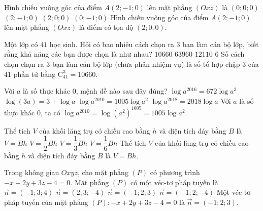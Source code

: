 \begin{ex}%
 Hình chiếu vuông góc của điểm $A(2;-1;0)$ lên mặt phẳng $(Oxz)$ là
 \choice
  {$(0;0;0)$}
  {$(2;-1;0)$}
  {\True $(2;0;0)$}
  {$(0;-1;0)$}
 \loigiai
  {
  Hình chiếu vuông góc của điểm $A(2;-1;0)$ lên mặt phẳng $(Oxz)$ là điểm có tọa độ $(2;0;0)$.
  }
\end{ex}


\begin{ex}%
 Một lớp có $41$ học sinh. Hỏi có bao nhiêu cách chọn ra $3$ bạn làm cán bộ lớp, biết rằng khả năng các bạn được chọn là như nhau?
 \choice
  {\True $10660$}
  {$63960$}
  {$12110$}
  {$6$}
 \loigiai
  {
  Số cách chọn chọn ra $3$ bạn làm cán bộ lớp (chưa phân nhiệm vụ) là số tổ hợp chập $3$ của $41$ phần tử bằng $\mathrm{C}_{41}^3 = 10660$.
  }
\end{ex}


\begin{ex}%
 Với $a$ là số thực khác $0$, mệnh đề nào sau đây đúng?
 \choice
  {$\log a^{2016} = 672\log a^3$}
  {$\log(3a) = 3 + \log a$}
  {\True $\log a^{2010} = 1005\log a^2$}
  {$\log a^{2018} = 2018\log a$}
 \loigiai
  {
  Với $a$ là số thực khác $0$, ta có $\log a^{2010} = \log (a^2)^{1005} = 1005\log a^2$.
  }
\end{ex}


\begin{ex}%
 Thể tích $V$ của khối lăng trụ có chiều cao bằng $h$ và diện tích đáy bằng $B$ là
 \choice
  {\True $V = Bh$}
  {$V = \dfrac{1}{2}Bh$}
  {$V = \dfrac{1}{3}Bh$}
  {$V = \dfrac{1}{6}Bh$}
 \loigiai
  {
  Thể tích $V$ của khối lăng trụ có chiều cao bằng $h$ và diện tích đáy bằng $B$ là $V = Bh$.
  }
\end{ex}


\begin{ex}%
 Trong không gian $Oxyz$, cho mặt phẳng $(P)$ có phương trình $-x+2y+3z-4=0$. Mặt phẳng $(P)$ có một véc-tơ pháp tuyến là
 \choice
  {$\vec{n} = (-1;3;4)$}
  {$\vec{n} = (2;3;-4)$}
  {\True $\vec{n} = (-1;2;3)$}
  {$\vec{n} = (-1;2;-4)$}
 \loigiai
  {
  Một véc-tơ pháp tuyến của mặt phẳng $(P)\colon -x+2y+3z-4=0$ là $\vec{n} = (-1;2;3)$.
  }
\end{ex}


